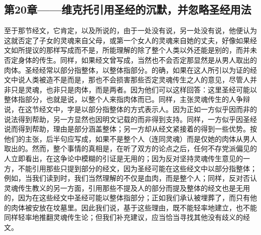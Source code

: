 
\subsection{第20章——维克托引用圣经的沉默，并忽略圣经用法}

至于那节经文，它肯定，以及所说的，由于一处没有说，另一处没有说，他便认为这就否定了子女的灵魂来自父母，或第一个女人的灵魂来自她的丈夫，好像如果经文如所提议的那样写成而不是，所能理解的除了整个人类以外还能是别的，而并未否定身体的传生。同样，如果经文曾写成，当然也不会否定那显然是从男人取出的肉体。圣经经常以部分指整体，以整体指部分。的确，如果在这人所引以为证的经文中说人类被造不是而是，那也不会损害那些否定灵魂传生之人的意见，尽管人并非只是灵魂，也非只是肉体，而是两者。因为他们可以这样回答：这里圣经可能以整体指部分，也就是说，以整个人来指肉体而已。同样，主张灵魂传生的人争辩说，在这节经文中，字是以部分指整体的方式表示人。因为正如一方似乎因而非的说法得到帮助，另一方显然也因明文记载的而非得到支持。同样，一方似乎因圣经说而得到帮助，理由是部分涵盖整体；另一方却从经文紧接着的得到一些优势。按他们的主张，后半句应写成，如果不是整个人（连同灵魂）而是仅她的肉体从男人取出的。然而，整个事情的真相是，在听了双方的论点之后，任何不存党派偏见的人立即看出，在这争论中模糊的引证是无用的；因为反对坚持灵魂传生意见的一方，不能引用那些只提到部分的经文，因为圣经可能在这些经文中以部分指整体；例如，当我们读到时，我们当然理解的不仅是血肉，而是整个人；同样，反对否认灵魂传生教义的另一方面，引用那些不提及人的部分而提及整体的经文也是无用的，因为在这些经文中圣经可能以整体指部分；正如我们承认被埋葬了，而只有他的肉体被安放在坟墓里。因此我们说，基于这些理由，既不能轻率地建立，也不能同样轻率地推翻灵魂传生论；但我们补充建议，应当恰当寻找其他没有歧义的经文。\par

